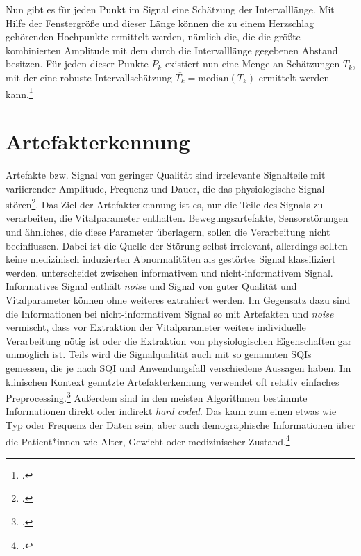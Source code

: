 	Nun gibt es für jeden Punkt im Signal eine Schätzung der Intervalllänge. Mit Hilfe der Fenstergröße und dieser Länge können die zu einem Herzschlag gehörenden Hochpunkte ermittelt werden, nämlich die, die die größte kombinierten Amplitude mit dem durch die Intervalllänge gegebenen Abstand besitzen. Für jeden dieser Punkte $P_k$ existiert nun eine Menge an Schätzungen $T_k$, mit der eine robuste Intervallschätzung $\overline{T_k} = \text{median}(T_k)$ ermittelt werden kann.\footcites[Vgl. zu diesem Kapitel][]{Bruser2013}

\section{Artefakterkennung}\label{artefakterkennung}
	
	Artefakte bzw. Signal von geringer Qualität sind irrelevante Signalteile mit variierender Amplitude, Frequenz und Dauer, die das physiologische Signal stören\footcite[Vgl.][]{Nizami2013}. Das Ziel der Artefakterkennung ist es, nur die Teile des Signals zu verarbeiten, die Vitalparameter enthalten. Bewegungsartefakte, Sensorstörungen und ähnliches, die diese Parameter überlagern, sollen die Verarbeitung nicht beeinflussen. Dabei ist die Quelle der Störung selbst irrelevant, allerdings sollten keine medizinisch induzierten Abnormalitäten als gestörtes Signal klassifiziert werden. \citeauthor{Sadek2016} unterscheidet zwischen informativem und nicht-informativem Signal. Informatives Signal enthält \textit{noise} und Signal von guter Qualität und Vitalparameter können ohne weiteres extrahiert werden. Im Gegensatz dazu sind die Informationen bei nicht-informativem Signal so mit Artefakten und \textit{noise} vermischt, dass vor Extraktion der Vitalparameter weitere individuelle Verarbeitung nötig ist oder die Extraktion von physiologischen Eigenschaften gar unmöglich ist. Teils wird die Signalqualität auch mit so genannten \acp{SQI} gemessen, die je nach \ac{SQI} und Anwendungsfall verschiedene Aussagen haben. Im klinischen Kontext genutzte Artefakterkennung verwendet oft relativ einfaches Preprocessing.\footcite[Vgl.][]{Nizami2013} Außerdem sind in den meisten Algorithmen bestimmte Informationen direkt oder indirekt \textit{hard coded}. Das kann zum einen etwas wie Typ oder Frequenz der Daten sein, aber auch demographische Informationen über die Patient*innen wie Alter, Gewicht oder medizinischer Zustand.\footcite[Vgl.][]{Nizami2013}
		
